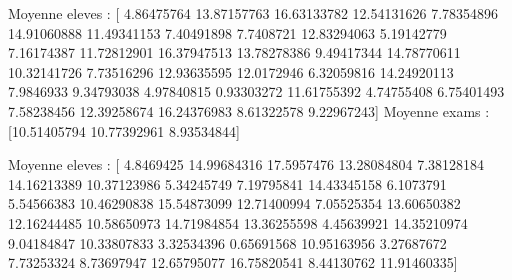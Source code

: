 \documentclass[letterpaper,10pt,english]{sphinxhowto}
\begin{document}
\begin{sphinxVerbatim}[commandchars=\\\{\}]
  
  

\end{sphinxVerbatim}

\begin{sphinxVerbatim}[commandchars=\\\{\}]
Moyenne eleves : [ 4.86475764 13.87157763 16.63133782 12.54131626  7.78354896 14.91060888
 11.49341153  7.40491898  7.7408721  12.83294063  5.19142779  7.16174387
 11.72812901 16.37947513 13.78278386  9.49417344 14.78770611 10.32141726
  7.73516296 12.93635595 12.0172946   6.32059816 14.24920113  7.9846933
  9.34793038  4.97840815  0.93303272 11.61755392  4.74755408  6.75401493
  7.58238456 12.39258674 16.24376983  8.61322578  9.22967243]
Moyenne exams : [10.51405794 10.77392961  8.93534844]
\end{sphinxVerbatim}

\begin{sphinxVerbatim}[commandchars=\\\{\}]
  \PYG{p}{[}  \PYG{p}{]}\PYG{p}{[} \PYG{p}{]}
\end{sphinxVerbatim}

\begin{sphinxVerbatim}[commandchars=\\\{\}]
Moyenne eleves : [ 4.8469425  14.99684316 17.5957476  13.28084804  7.38128184 14.16213389
 10.37123986  5.34245749  7.19795841 14.43345158  6.1073791   5.54566383
 10.46290838 15.54873099 12.71400994  7.05525354 13.60650382 12.16244485
 10.58650973 14.71984854 13.36255598  4.45639921 14.35210974  9.04184847
 10.33807833  3.32534396  0.65691568 10.95163956  3.27687672  7.73253324
  8.73697947 12.65795077 16.75820541  8.44130762 11.91460335]
\end{sphinxVerbatim}
\end{document}
